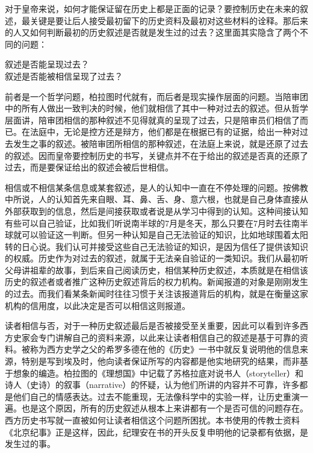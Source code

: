 
对于皇帝来说，如何才能保证留在历史上都是正面的记录？要控制历史在未来的叙述，最关键是要让后人接受最初留下的历史资料及最初对这些材料的诠释。那后来的人又如何判断最初的历史叙述是否就是发生过的过去？这里面其实隐含了两个不同的问题：



\begin{bookquote}
叙述是否能呈现过去？\\
叙述是否能被相信呈现了过去？
\end{bookquote}



前者是一个哲学问题，柏拉图时代就有，而后者是现实操作层面的问题。当陪审团中的所有人做出一致判决的时候，他们就相信了其中一种对过去的叙述。但从哲学层面讲，陪审团相信的那种叙述不见得就真的呈现了过去，只是陪审员们相信了而已。在法庭中，无论是控方还是辩方，他们都是在根据已有的证据，给出一种对过去发生之事的叙述。被陪审团所相信的那种叙述，在法庭上来说，就是还原了过去的叙述。因而皇帝要控制历史的书写，关键点并不在于给出的叙述是否真的还原了过去，而是要保证给出的叙述会被后世相信。



相信或不相信某条信息或某套叙述，是人的认知中一直在不停处理的问题。按佛教中所说，人的认知首先来自眼、耳、鼻、舌、身、意六根，也就是自己身体直接从外部获取到的信息，然后是间接获取或者说是从学习中得到的认知。这种间接认知有些可以自己验证，比如我们听说南半球的7月是冬天，那么只要在7月时去往南半球就可以验证这一判断。但另一种认知是自己无法验证的知识，比如地球围着太阳转的日心说。我们认可并接受这些自己无法验证的知识，是因为信任了提供该知识的权威。历史作为对过去的叙述，就属于无法亲自验证的一类知识。我们从最初听父母讲祖辈的故事，到后来自己阅读历史，相信某种历史叙述，本质就是在相信该历史的叙述者或者推广这种历史叙述背后的权力机构。新闻报道的对象是刚刚发生的过去。而我们看某条新闻时往往习惯于关注该报道背后的机构，就是在衡量这家机构的信用度，以此决定是否可以相信这则报道。



读者相信与否，对于一种历史叙述最后是否被接受至关重要，因此可以看到许多西方史家会专门讲解自己的资料来源，以此来让读者相信自己的叙述是基于可靠的资料。被称为西方史学之父的希罗多德在他的《历史》一书中就反复说明他的信息来源，特别是写到埃及时，他向读者保证所写的内容都是他实地研究的结果，而非基于想象的编造。柏拉图的《理想国》中记载了苏格拉底对说书人（storyteller）和诗人（史诗）的叙事（narrative）的怀疑，认为他们所讲的内容并不可靠，许多都是他们自己的情感表达。过去不能重现，无法像科学中的实验一样，让历史重演一遍。也是这个原因，所有的历史叙述从根本上来讲都有一个是否可信的问题存在。西方历史书写就一直被如何让读者相信这个问题所困扰。本书使用的传教士资料《北京纪事》正是这样，因此，纪理安在书的开头反复申明他的记录都有依据，是发生过的事。


